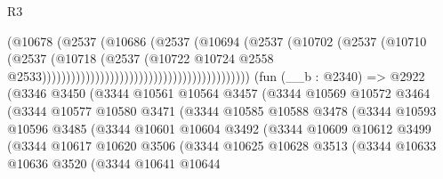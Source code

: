 \begin{lexlean}{R3}
\begin{coremodule}
                                                                (@10678
                                                                  (@2537
                                                                    (@10686
                                                                      (@2537
                                                                        (@10694
                                                                          (@2537
                                                                            (@10702
                                                                              (@2537
                                                                                (@10710
                                                                                  (@2537
                                                                                    (@10718
                                                                                      (@2537
                                                                                        (@10722
                                                                                          @10724
                                                                                          @2558
                                                                                          @2533)))))))))))))))))))))))))))))))))))))))))))
    (fun (__b : @2340) =>
    @2922
      (@3346
        @3450
        (@3344
          @10561
          @10564
          @3457
          (@3344
            @10569
            @10572
            @3464
            (@3344
              @10577
              @10580
              @3471
              (@3344
                @10585
                @10588
                @3478
                (@3344
                  @10593
                  @10596
                  @3485
                  (@3344
                    @10601
                    @10604
                    @3492
                    (@3344
                      @10609
                      @10612
                      @3499
                      (@3344
                        @10617
                        @10620
                        @3506
                        (@3344
                          @10625
                          @10628
                          @3513
                          (@3344
                            @10633
                            @10636
                            @3520
                            (@3344
                              @10641
                              @10644

\end{coremodule}
\end{lexlean}
